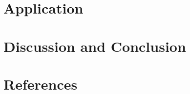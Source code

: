 \documentclass[12pt]{article}
\begin{document}
\section{Application}
\label{sec:app}


\section{Discussion and Conclusion}
\label{sec:disc}



\section{References}
\label{sec:refer}

\end{document}
